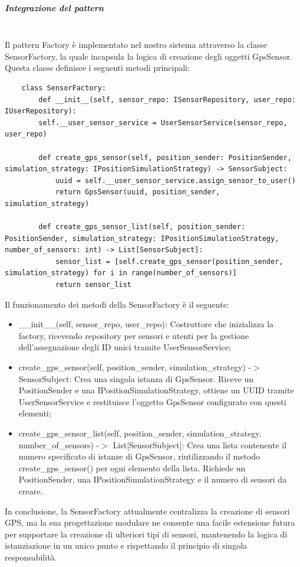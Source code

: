 \documentclass[10pt]{article}
\newcommand{\mysubparagraph}[1]{\subparagraph{#1}\mbox{}\\}
\begin{document}
    \mysubparagraph{Integrazione del pattern}
    Il pattern Factory è implementato nel nostro sistema attraverso la classe SensorFactory, la quale incapsula la logica di creazione degli oggetti GpsSensor. Questa classe definisce i seguenti metodi principali:
    \begin{lstlisting}
    class SensorFactory:
        def __init__(self, sensor_repo: ISensorRepository, user_repo: IUserRepository):
        self.__user_sensor_service = UserSensorService(sensor_repo, user_repo)

        def create_gps_sensor(self, position_sender: PositionSender, simulation_strategy: IPositionSimulationStrategy) -> SensorSubject:
            uuid = self.__user_sensor_service.assign_sensor_to_user()
            return GpsSensor(uuid, position_sender, simulation_strategy)

        def create_gps_sensor_list(self, position_sender: PositionSender, simulation_strategy: IPositionSimulationStrategy, number_of_sensors: int) -> List[SensorSubject]:
            sensor_list = [self.create_gps_sensor(position_sender, simulation_strategy) for i in range(number_of_sensors)]
            return sensor_list
    \end{lstlisting}
    Il funzionamento dei metodi della SensorFactory è il seguente:
    \begin{itemize}
        \item \_\_init\_\_(self, sensor\_repo, user\_repo): Costruttore che inizializza la factory, ricevendo repository per sensori e utenti per la gestione dell'assegnazione degli ID unici tramite UserSensorService;
        \item create\_gps\_sensor(self, position\_sender, simulation\_strategy) -$>$ SensorSubject: Crea una singola istanza di GpsSensor. Riceve un PositionSender e una IPositionSimulationStrategy, ottiene un UUID tramite UserSensorService e restituisce l'oggetto GpsSensor configurato con questi elementi;
        \item create\_gps\_sensor\_list(self, position\_sender, simulation\_strategy, number\_of\_sensors) -$>$ List[SensorSubject]: Crea una lista contenente il numero specificato di istanze di GpsSensor, riutilizzando il metodo create\_gps\_sensor() per ogni elemento della lista. Richiede un PositionSender, una IPositionSimulationStrategy e il numero di sensori da creare.
    \end{itemize}
    In conclusione, la SensorFactory attualmente centralizza la creazione di sensori GPS, ma la sua progettazione modulare ne consente una facile estensione futura per supportare la creazione di ulteriori tipi di sensori, mantenendo la logica di istanziazione in un unico punto e rispettando il principio di singola responsabilità.
    
\end{document}
